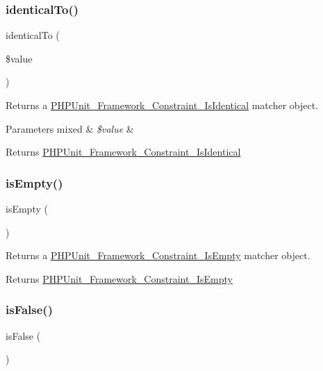 \subsubsection{\texorpdfstring{identical\+To()}{identicalTo()}}
{\footnotesize\ttfamily identical\+To (\begin{DoxyParamCaption}\item[{}]{\$value }\end{DoxyParamCaption})}

Returns a \mbox{\hyperlink{class_p_h_p_unit___framework___constraint___is_identical}{P\+H\+P\+Unit\+\_\+\+Framework\+\_\+\+Constraint\+\_\+\+Is\+Identical}} matcher object.


\begin{DoxyParams}[1]{Parameters}
mixed & {\em \$value} & \\
\hline
\end{DoxyParams}
\begin{DoxyReturn}{Returns}
\mbox{\hyperlink{class_p_h_p_unit___framework___constraint___is_identical}{P\+H\+P\+Unit\+\_\+\+Framework\+\_\+\+Constraint\+\_\+\+Is\+Identical}} 
\end{DoxyReturn}
\mbox{\label{_functions_8php_aedcc52b3673b8df9425e52f13accb2a1}} 
\subsubsection{\texorpdfstring{is\+Empty()}{isEmpty()}}
{\footnotesize\ttfamily is\+Empty (\begin{DoxyParamCaption}{ }\end{DoxyParamCaption})}

Returns a \mbox{\hyperlink{class_p_h_p_unit___framework___constraint___is_empty}{P\+H\+P\+Unit\+\_\+\+Framework\+\_\+\+Constraint\+\_\+\+Is\+Empty}} matcher object.

\begin{DoxyReturn}{Returns}
\mbox{\hyperlink{class_p_h_p_unit___framework___constraint___is_empty}{P\+H\+P\+Unit\+\_\+\+Framework\+\_\+\+Constraint\+\_\+\+Is\+Empty}} 
\end{DoxyReturn}
\mbox{\label{_functions_8php_ab66d633b29a2651291e004d81f262aa3}} 
\subsubsection{\texorpdfstring{is\+False()}{isFalse()}}
{\footnotesize\ttfamily is\+False (\begin{DoxyParamCaption}{ }\end{DoxyParamCaption})}

